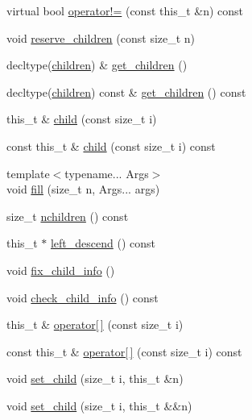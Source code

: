 \begin{DoxyCompactItemize}
\item 
virtual bool \hyperlink{class_base_node_a2f0418334eb790283f8074c9a27fed6e}{operator!=} (const this\+\_\+t \&n) const
\item 
void \hyperlink{class_base_node_abb32a7d0574ed17ddeb61e7262d090ad}{reserve\+\_\+children} (const size\+\_\+t n)
\item 
decltype(\hyperlink{class_base_node_af2f245862083d173c950fca048c03546}{children}) \& \hyperlink{class_base_node_a7177763ffa8b3e658124c586dde30be9}{get\+\_\+children} ()
\item 
decltype(\hyperlink{class_base_node_af2f245862083d173c950fca048c03546}{children}) const  \& \hyperlink{class_base_node_aec98c1640e03a27d1663f876bc49ef69}{get\+\_\+children} () const
\item 
this\+\_\+t \& \hyperlink{class_base_node_ac2ed3b362a2563e86063a157daa1c288}{child} (const size\+\_\+t i)
\item 
const this\+\_\+t \& \hyperlink{class_base_node_a2e244ddbbc0edea5f648e2a900e9dd99}{child} (const size\+\_\+t i) const
\item 
{\footnotesize template$<$typename... Args$>$ }\\void \hyperlink{class_base_node_aa7e88efda898c45f84ab0d79d4bb85c2}{fill} (size\+\_\+t n, Args... args)
\item 
size\+\_\+t \hyperlink{class_base_node_abae4d16401a958dc41d2852dedcf0721}{nchildren} () const
\item 
this\+\_\+t $\ast$ \hyperlink{class_base_node_ad319f28caf14e730bc62560f1bd682b6}{left\+\_\+descend} () const
\item 
void \hyperlink{class_base_node_ad0ef64be7c40f1e9f9170d8d51f8d3bf}{fix\+\_\+child\+\_\+info} ()
\item 
void \hyperlink{class_base_node_a83b33d8a8902819b4175b66fb6e4b08e}{check\+\_\+child\+\_\+info} () const
\item 
this\+\_\+t \& \hyperlink{class_base_node_a6aec587267d880a8f87312d90e74af56}{operator\mbox{[}$\,$\mbox{]}} (const size\+\_\+t i)
\item 
const this\+\_\+t \& \hyperlink{class_base_node_ad09bee05b19581e8827bdd03a31791a7}{operator\mbox{[}$\,$\mbox{]}} (const size\+\_\+t i) const
\item 
void \hyperlink{class_base_node_a575b94703d0c67ba8c04b6a725b48b56}{set\+\_\+child} (size\+\_\+t i, this\+\_\+t \&n)
\item 
void \hyperlink{class_base_node_a7c2892c91eb31bc0d72bfb0c57ec8dea}{set\+\_\+child} (size\+\_\+t i, this\+\_\+t \&\&n)

\end{DoxyCompactItemize}

